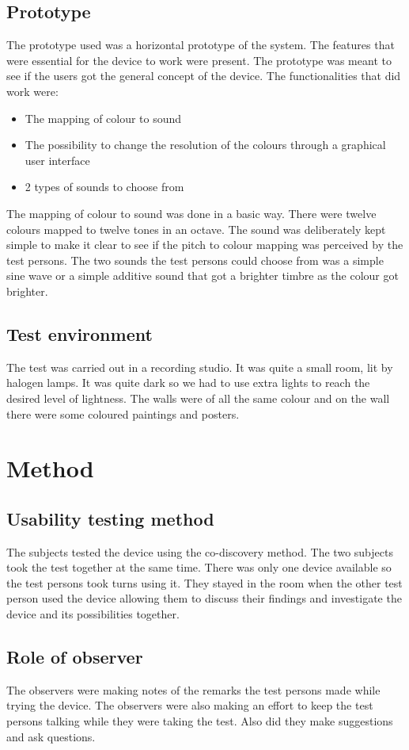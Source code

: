\documentclass[11pt]{article}
\begin{document}
\subsection{Prototype}
The prototype used was a horizontal prototype of the system. The features that were essential for the device to work were present. The prototype was meant to see if the users got the general concept of the device.
The functionalities that did work were:
\begin{itemize}
\item The mapping of colour to sound
\item The possibility to change the resolution of the colours through a graphical user interface
\item 2 types of sounds to choose from
\end{itemize}
The mapping of colour to sound was done in a basic way. There were twelve colours mapped to twelve tones in an octave. The sound was deliberately kept simple to make it clear to see if the pitch to colour mapping was perceived by the test persons. The two sounds the test persons could choose from was a simple sine wave or a simple additive sound that got a brighter timbre as the colour got brighter.
\subsection{Test environment}
The test was carried out in a recording studio. It was quite a small room, lit by halogen lamps. It was quite dark so we had to use extra lights to reach the desired level of lightness. The walls were of all the same colour and on the wall there were some coloured paintings and posters.

\section{Method}
\subsection{Usability testing method}
The subjects tested the device using the co-discovery method. The two subjects took the test together at the same time. There was only one device available so the test persons took turns using it. They stayed in the room when the other test person used the device allowing them to discuss their findings and investigate the device and its possibilities together.
\subsection{Role of observer}
The observers were making notes of the remarks the test persons made while trying the device. The observers were also making an effort to keep the test persons talking while they were taking the test. Also did they make suggestions and ask questions.
\end{document}
